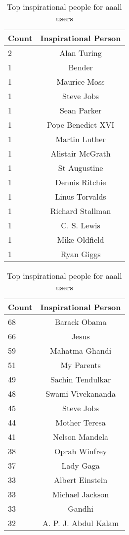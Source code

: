 \begin{table}[h]
\begin{minipage}[b]{.50\textwidth}
\centering
  \begin{tabular}{|l|c|} %
  \hline
  		\textbf{Count} & \textbf{Inspirational Person} \\ \hline
  		2 & Alan Turing \\ \hline
		1 & Bender \\ \hline
		1 & Maurice Moss \\ \hline
		1 & Steve Jobs \\ \hline
		1 & Sean Parker \\ \hline
		1 & Pope Benedict XVI \\ \hline
		1 & Martin Luther \\ \hline
		1 & Alistair McGrath \\ \hline
		1 & St Augustine \\ \hline
		1 & Dennis Ritchie \\ \hline
		1 & Linus Torvalds \\ \hline
		1 & Richard Stallman \\ \hline
		1 & C. S. Lewis \\ \hline
		1 & Mike Oldfield \\ \hline
		1 & Ryan Giggs \\ \hline
  \end{tabular}
  \caption{Top inspirational people for app users}
\end{minipage}
\begin{minipage}[b]{.50\textwidth}
\centering
  \begin{tabular}{|l|c|} %
  \hline
  		\textbf{Count} & \textbf{Inspirational Person} \\ \hline
  		68 & Barack Obama \\ \hline
		66 & Jesus \\ \hline
		59 & Mahatma Ghandi \\ \hline
		51 & My Parents \\ \hline
		49 & Sachin Tendulkar \\ \hline
		48 & Swami Vivekananda \\ \hline
		45 & Steve Jobs \\ \hline
		44 & Mother Teresa \\ \hline
		41 & Nelson Mandela \\ \hline
		38 & Oprah Winfrey \\ \hline
		37 & Lady Gaga \\ \hline
		33 & Albert Einstein \\ \hline
		33 & Michael Jackson \\ \hline
		33 & Gandhi \\ \hline
		32 & A. P. J. Abdul Kalam \\ \hline
  \end{tabular}
  \caption{Top inspirational people for aaall users}
\end{minipage}


\end{table}
